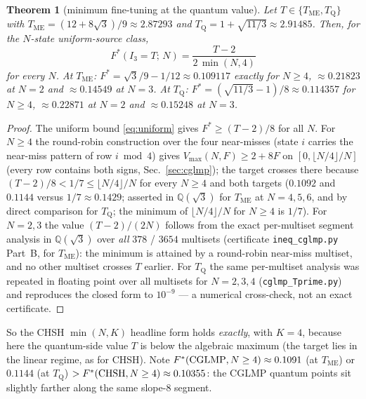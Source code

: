 \documentclass[aps,pra,reprint,superscriptaddress,floatfix]{revtex4-2}
\newtheorem{theorem}{Theorem}
\begin{document}
\begin{theorem}[minimum fine-tuning at the quantum value]
\label{thm:cglmp}
Let $T\in\{T_{\mathrm{ME}},T_{\mathrm{Q}}\}$ with
$T_{\mathrm{ME}}=(12+8\sqrt{3})/9\approx 2.87293$ and
$T_{\mathrm{Q}}=1+\sqrt{11/3}\approx2.91485$. Then, for the $N$-state
uniform-source class,
\begin{equation}
F^{*}(I_{3}=T;\,N)=\frac{T-2}{2\,\min(N,4)}
\label{eq:fcglmp}
\end{equation}
for every $N$. At $T_{\mathrm{ME}}$: $F^{*}=\sqrt{3}/9-1/12\approx
0.109117$ exactly for $N\ge 4$, $\approx0.21823$ at $N=2$ and
$\approx0.14549$ at $N=3$. At $T_{\mathrm{Q}}$:
$F^{*}=(\sqrt{11/3}-1)/8\approx0.114357$ for $N\ge4$, $\approx0.22871$ at
$N=2$ and $\approx0.15248$ at $N=3$.
\end{theorem}

\begin{proof}
The uniform bound \eqref{eq:uniform} gives $F^{*}\ge (T-2)/8$ for all
$N$. For $N\ge 4$ the round-robin construction over the four near-misses
(state $i$ carries the near-miss pattern of row $i\bmod 4$) gives
$V_{\max}(N,F)\ge 2+8F$ on $[0,\lfloor N/4\rfloor/N]$ (every row contains
both signs, Sec.~\ref{sec:cglmp}); the target crosses there because
$(T-2)/8<1/7\le \lfloor N/4\rfloor/N$ for every $N\ge 4$ and both targets
($0.1092$ and $0.1144$ versus $1/7\approx0.1429$; asserted in
$\mathbb{Q}(\sqrt{3})$ for $T_{\mathrm{ME}}$ at $N=4,5,6$, and by direct
comparison for $T_{\mathrm{Q}}$; the minimum of $\lfloor N/4\rfloor/N$ for
$N\ge 4$ is $1/7$). For $N=2,3$ the value $(T-2)/(2N)$ follows from the
exact per-multiset segment analysis in $\mathbb{Q}(\sqrt{3})$ over
\emph{all} $378$ / $3654$ multisets (certificate \texttt{ineq\_cglmp.py}
Part~B, for $T_{\mathrm{ME}}$): the minimum is attained by a round-robin
near-miss multiset, and no other multiset crosses $T$ earlier. For
$T_{\mathrm{Q}}$ the same per-multiset analysis was repeated in floating
point over all multisets for $N=2,3,4$ (\texttt{cglmp\_Tprime.py}) and
reproduces the closed form to $10^{-9}$ --- a numerical cross-check, not an
exact certificate.
\end{proof}

So the {CHSH} $\min(N,K)$ headline form holds \emph{exactly}, with $K=4$,
because here the quantum-side value $T$ is below the algebraic maximum
(the target lies in the linear regime, as for {CHSH}). Note
$F^{*}({\rm CGLMP},N\ge 4)\approx 0.1091$ (at $T_{\mathrm{ME}}$) or
$0.1144$ (at $T_{\mathrm{Q}}$) $>F^{*}({\rm CHSH},N\ge 4)\approx 0.10355$:
the {CGLMP} quantum points sit slightly farther along the same slope-$8$
segment.
\end{document}
